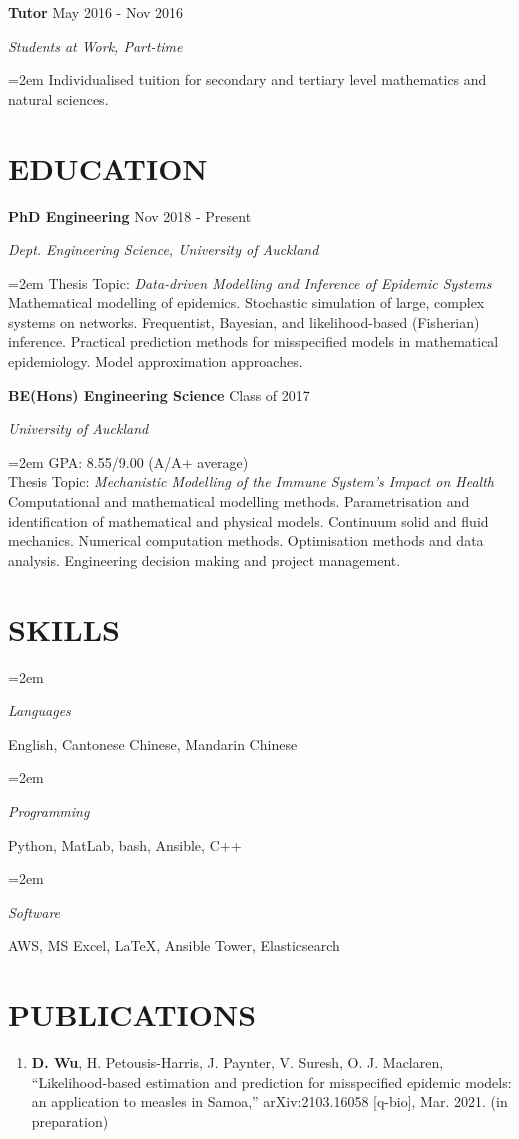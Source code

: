 \documentclass[paper=a4paper,fontsize=11pt]{scrartcl} %
\newlength{\spacebox}
\newcommand{\NewPart}[1]{\section*{\uppercase{#1}}}
\newcommand{\PersonalEntry}[2]{
		\noindent\hangindent=2em\hangafter=0 %
		\parbox{\spacebox}{        %
		\textit{#1}}		       %
		\hspace{1.5em} #2 \par}    %
\newcommand{\SkillsEntry}[2]{      %
		\noindent\hangindent=2em\hangafter=0 %
		\parbox{\spacebox}{        %
		\textit{#1}}			   %
		\hspace{1.5em} #2 \par}    %
\newcommand{\EducationEntry}[4]{
		\noindent \textbf{#1} \hfill      %
		{#2} \par  %
		\noindent \textit{#3} \par        %
		\noindent\hangindent=2em\hangafter=0 \small #4 %
		\normalsize \par\par}
\newcommand{\WorkEntry}[4]{				  %
		\noindent \textbf{#1} \hfill      %
		{#2} \par  %
		\noindent \textit{#3} \par              %
		\noindent\hangindent=2em\hangafter=0 \small #4 %
		\normalsize \par\par}
\begin{document}
\WorkEntry{Tutor}{May 2016 - Nov 2016}{Students at Work, Part-time}{Individualised tuition for secondary and tertiary level mathematics and natural sciences.}

\NewPart{Education}

\EducationEntry{PhD Engineering}{Nov 2018 - Present}{Dept. Engineering Science, University of Auckland}{Thesis Topic: \textit{Data-driven Modelling and Inference of Epidemic Systems}\\ Mathematical modelling of epidemics. Stochastic simulation of large, complex systems on networks. Frequentist, Bayesian, and likelihood-based (Fisherian) inference. Practical prediction methods for misspecified models in mathematical epidemiology. Model approximation approaches.}

\EducationEntry{BE(Hons) Engineering Science}{Class of 2017}{University of Auckland}{GPA: 8.55/9.00 (A/A+ average)\\ Thesis Topic: \textit{Mechanistic Modelling of the Immune System's Impact on Health} \\ Computational and mathematical modelling methods. Parametrisation and identification of mathematical and physical models. Continuum solid and fluid mechanics. Numerical computation methods. Optimisation methods and data analysis. Engineering decision making and project management.}


\NewPart{Skills}


\SkillsEntry{Languages}{English, Cantonese Chinese, Mandarin Chinese}

\SkillsEntry{Programming}{Python, MatLab, bash, Ansible, C++}

\SkillsEntry{Software}{AWS, MS Excel, \LaTeX, Ansible Tower, Elasticsearch}%

\NewPart{Publications}
\begin{enumerate}
    \item \textbf{D. Wu}, H. Petousis-Harris, J. Paynter, V. Suresh, O. J. Maclaren, ``Likelihood-based estimation and prediction for misspecified epidemic models: an application to measles in Samoa,'' arXiv:2103.16058 [q-bio], Mar. 2021. (in preparation)
\end{enumerate}
\end{document}
